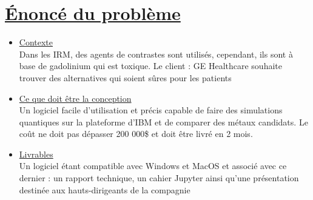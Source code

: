 \documentclass[11pt]{article}
\begin{document}
\section{\underline{Énoncé du problème}}

\begin{itemize}
  \item \underline{Contexte}\\Dans les IRM, des agents de contrastes sont utilisés, cependant, ils sont à base de gadolinium qui est toxique. Le client : GE Healthcare souhaite trouver des alternatives qui soient sûres pour les patients
  \item \underline{Ce que doit être la conception}\\Un logiciel facile d'utilisation et précis capable de faire des simulations quantiques sur la plateforme d'IBM et de comparer des métaux candidats. Le coût ne doit pas dépasser 200 000\$ et doit être livré en 2 mois.
  \item \underline{Livrables}\\Un logiciel étant compatible avec Windows et MacOS et associé avec ce dernier : un rapport technique, un cahier Jupyter ainsi qu'une présentation destinée aux hauts-dirigeants de la compagnie
\end{itemize}
\end{document}
